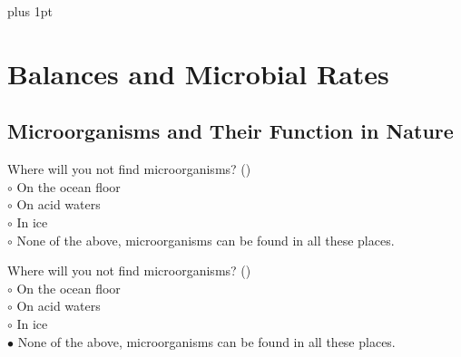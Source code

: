 \documentclass[]{beamer}
\begin{document}
\parskip=1cm plus 1pt


\section{Balances and Microbial Rates}




\subsection{Microorganisms and Their Function in Nature}

\setcounter{questions}{0}
\setcounter{answers}{0}
\setcounter{questions}{0}
\setcounter{answers}{0}
\begin{frame}[shrink] {}
\addtocounter{questions}{1}
\color{blue}
Where will you not find microorganisms? ()\\
\color{black}
\setlength{\parindent}{-0.4cm}
{\color{red}$\circ$} On the ocean floor \\
{\color{red}$\circ$} On acid waters  \\
{\color{red}$\circ$} In ice  \\
{\color{red}$\circ$} None of the above, microorganisms can be found in all these places. \\
\end{frame}
\begin{frame}[shrink] {}
\addtocounter{answers}{1}
\color{blue}
Where will you not find microorganisms? ()\\
\color{black}
\setlength{\parindent}{-0.4cm}
{\color{red}$\circ$} On the ocean floor \\
{\color{red}$\circ$} On acid waters  \\
{\color{red}$\circ$} In ice  \\
{\color{red}$\bullet$} None of the above, microorganisms can be found in all these places. \\
\end{frame}
\end{document}
